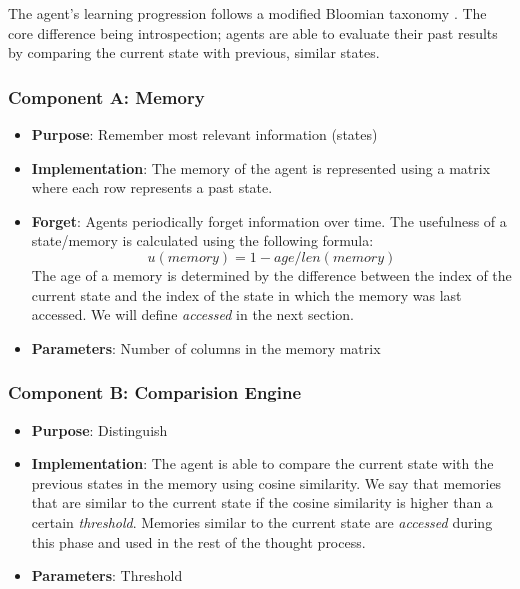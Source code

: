 \documentclass[12pt]{article}
\begin{document}
The agent's learning progression follows a modified Bloomian taxonomy \cite{anderson2001}. The core difference being introspection; agents are able to evaluate their past results by comparing the current state with previous, similar states.


\subsubsection{Component A: Memory}
\begin{itemize}
    \item \textbf{Purpose}: Remember most relevant information (states)
    \item \textbf{Implementation}: 
        The memory of the agent is represented using a matrix where each row represents
        a past state.
        \item \textbf{Forget}: Agents periodically forget information over time.
            The usefulness of a state/memory is calculated using the following formula:
        \begin{equation}
            u(memory) = 1 - age/len(memory)
        \end{equation}
        The age of a memory is determined by the difference between the index of the current state and the index of the
        state in which the memory was last accessed.
        We will define \emph{accessed} in the next section.
\item \textbf{Parameters}: Number of columns in the memory matrix
\end{itemize}

\subsubsection{Component B: Comparision Engine}
\begin{itemize}
    \item \textbf{Purpose}: Distinguish
    \item \textbf{Implementation}:
        The agent is able to compare the current state with the previous states in the memory
        using cosine similarity.
        We say that memories that are similar to the current state if the cosine similarity is
        higher than a certain \emph{threshold}.
        Memories similar to the current state are \emph{accessed} during this phase and used
        in the rest of the thought process.
\item \textbf{Parameters}: Threshold
\end{itemize}
\end{document}
